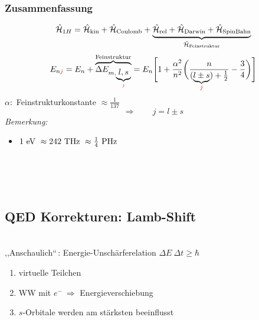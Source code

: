 \subsubsection{Zusammenfassung}

\begin{equation*}
\hat{\mathcal{H}}_{1 H} = \hat{\mathcal{H}}_{\textrm{kin}} + \hat{\mathcal{H}}_{\textrm{Coulomb}} + \underbrace{\hat{\mathcal{H}}_{\textrm{rel}} + \hat{\mathcal{H}}_{\textrm{Darwin}} + \hat{\mathcal{H}}_{\textrm{SpinBahn}}}_{\hat{\mathcal{H}}_{\textrm{Feinstruktur}}}
\end{equation*}
%
%
%
%
%
%
\begin{equation*}
E_{n \color{red} j \color{black}} = E_n + \overbrace{\Delta E_{m, \underbrace{l, s}_{\color{red} j \color{black}}}}^{\textrm{Feinstruktur}} = E_n \Bigg[1 + \frac{\alpha^2}{n^2} \bigg(\frac{n}{(\underbrace{l \pm s}_{\color{red} j \color{black}}) + \frac{1}{2}} - \frac{3}{4}\bigg)\Bigg]
\end{equation*}
$ \alpha : $ Feinstrukturkonstante $ \approx \frac{1}{137} $
\begin{equation*}
\Rightarrow \qquad j = l \pm s
\end{equation*}
\emph{Bemerkung:}
\begin{itemize}
	\item $ 1 \textrm{ eV } \approx 242 \textrm{ THz } \approx \frac{1}{4} \textrm{ PHz } $
\end{itemize}
\\
\\
\\

\subsection{QED Korrekturen: Lamb-Shift}

\\
,,Anschaulich``\,: Energie-Unschärferelation $ \Delta E \ \Delta t \ge \hbar $\\
\begin{enumerate}[$ \Rightarrow $]
	\item virtuelle Teilchen
	\item WW mit $ e^- \ \Rightarrow $ Energieverschiebung
	\item $ s $-Orbitale werden am stärksten beeinflusst
\end{enumerate}

